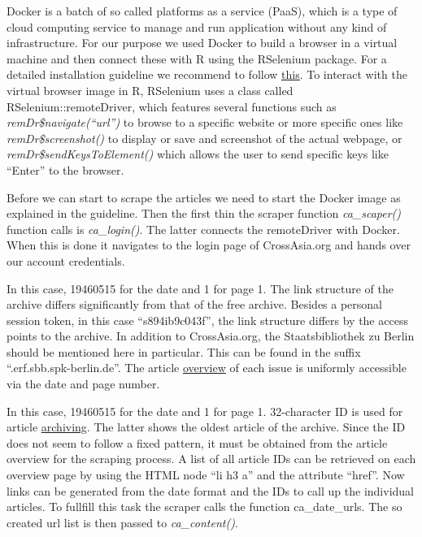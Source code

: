 \documentclass[12pt,a4paper]{article}
\begin{document}
Docker is a batch of so called platforms as a service (PaaS), which is a type of cloud computing service to manage and run application without any kind of infrastructure. For our purpose we used Docker to build a browser in a virtual machine and then connect these with R using the RSelenium package. For a detailed installation guideline we recommend to follow \href{https://docs.ropensci.org/RSelenium/articles/docker.html}{this}. To interact with the virtual browser image in R, RSelenium uses a class called RSelenium::remoteDriver, which features several functions such as \emph{remDr\$navigate(\enquote{url})} to browse to a specific website or more specific ones like \emph{remDr\$screenshot()} to display or save and screenshot of the actual webpage, or \emph{remDr\$sendKeysToElement()} which allows the user to send specific keys like \enquote{Enter} to the browser.

Before we can start to scrape the articles we need to start the Docker image as explained in the guideline. Then the first thin the scraper function \emph{ca\_scaper()} function calls is \emph{ca\_login()}. The latter connects the remoteDriver with Docker. When this is done it navigates to the login page of CrossAsia.org and hands over our account credentials.

In this case, 19460515 for the date and 1 for page 1. The link structure of the archive differs significantly from that of the free archive. Besides a personal session token, in this case \enquote{s894ib9c043f}, the link structure differs by the access points to the archive. In addition to CrossAsia.org, the Staatsbibliothek zu Berlin should be mentioned here in particular. This can be found in the suffix \enquote{.erf.sbb.spk-berlin.de}. The article \href{http://data.people.com.cn.s894ib9c043f.erf.sbb.spk-berlin.de/rmrb/19460515/1/}{overview} of each issue is uniformly accessible via the date and page number.

In this case, 19460515 for the date and 1 for page 1. 32-character ID is used for article \href{http://data.people.com.cn.s894ib9c043f.erf.sbb.spk-berlin.de/rmrb/19460515/1/cae1d1ef94a74c8e99ad43189652fb40}{archiving}. The latter shows the oldest article of the archive. Since the ID does not seem to follow a fixed pattern, it must be obtained from the article overview for the scraping process. A list of all article IDs can be retrieved on each overview page by using the HTML node \enquote{li h3 a} and the attribute \enquote{href}. Now links can be generated from the date format and the IDs to call up the individual articles. To fullfill this task the scraper calls the function ca\_date\_urls. The so created url list is then passed to \emph{ca\_content()}.
\end{document}
